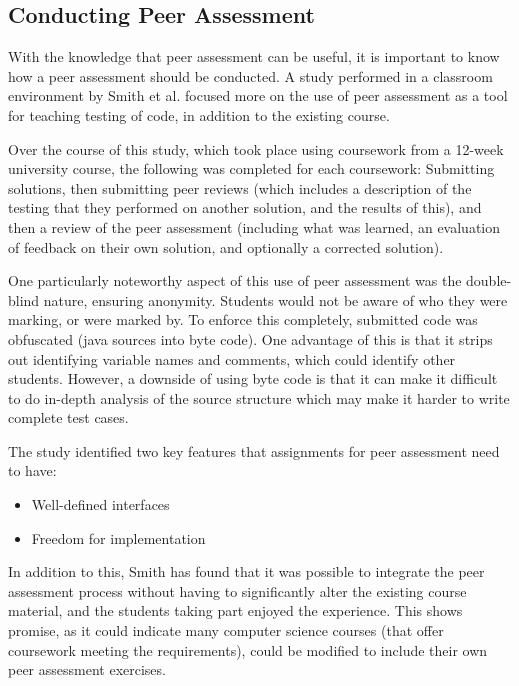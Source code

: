 \documentclass[a4paper,11pt]{report}
\begin{document}
\subsection{Conducting Peer Assessment}
With the knowledge that peer assessment can be useful, it is important to know how a peer assessment should be conducted. A study performed in a classroom environment by Smith et al.\cite{smith_using_2012} focused more on the use of peer assessment as a tool for teaching testing of code, in addition to the existing course.\par
Over the course of this study, which took place using coursework from a 12-week university course, the following was completed for each coursework: Submitting solutions, then submitting peer reviews (which includes a description of the testing that they performed on another solution, and the results of this), and then a review of the peer assessment (including what was learned, an evaluation of feedback on their own solution, and optionally a corrected solution).\par
One particularly noteworthy aspect of this use of peer assessment was the double-blind nature, ensuring anonymity. Students would not be aware of who they were marking, or were marked by. To enforce this completely, submitted code was obfuscated (java sources into byte code). One advantage of this is that it strips out identifying variable names and comments, which could identify other students. However, a downside of using byte code is that it can make it difficult to do in-depth analysis of the source structure which may make it harder to write complete test cases.\par
The study identified two key features that assignments for peer assessment need to have:
\begin{itemize}
 \item Well-defined interfaces
 \item Freedom for implementation
\end{itemize}
In addition to this, Smith has found that it was possible to integrate the peer assessment process without having to significantly alter the existing course material, and the students taking part enjoyed the experience. This shows promise, as it could indicate many computer science courses (that offer coursework meeting the requirements), could be modified to include their own peer assessment exercises.
\end{document}
